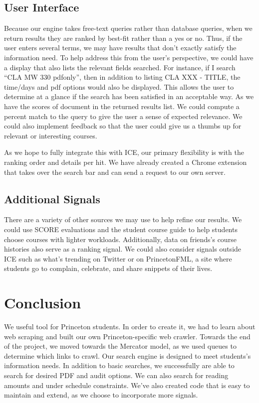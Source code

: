 \documentclass[12pt,letterpaper]{article}
\begin{document}
	
\subsection{User Interface}
Because our engine takes free-text queries rather than database queries, when we return results they are ranked by best-fit rather than a yes or no. Thus, if the user enters several terms, we may have results that don't exactly satisfy the information need. To help address this from the user's perspective, we could have a display that also lists the relevant fields searched. For instance, if I search ``CLA MW 330 pdfonly'', then in addition to listing CLA XXX - TITLE, the time/days and pdf options would also be displayed. This allows the user to determine at a glance if the search has been satisfied in an acceptable way. 
As we have the scores of document in the returned results list. We could compute a percent match to the query to give the user a sense of expected relevance. We could also implement feedback so that the user could give us a thumbs up for relevant or interesting courses. 

As we hope to fully integrate this with ICE, our primary flexibility is with the ranking order and details per hit. We have already created a Chrome extension that takes over the search bar and can send a request to our own server.  

\subsection{Additional Signals}

There are a variety of other sources we may use to help refine our results. We could use SCORE evaluations and the student course guide to help students choose courses with lighter workloads. Additionally, data on friends's course histories also serve as a ranking signal. We could also consider signals outside ICE such as what's trending on Twitter or on PrincetonFML, a site where students go to complain, celebrate, and share snippets of their lives. 

\section{Conclusion}

We useful tool for Princeton students. In order to create it, we had to learn about web scraping and built our own Princeton-specific web crawler. Towards the end of the project, we moved towards the Mercator model, as we used queues to determine which links to crawl. Our search engine is designed to meet students's information needs. In addition to basic searches, we successfully are able to search for desired PDF and audit options. We can also search for reading amounts and under schedule constraints. We've also created code that is easy to maintain and extend, as we choose to incorporate more signals.
\end{document}
